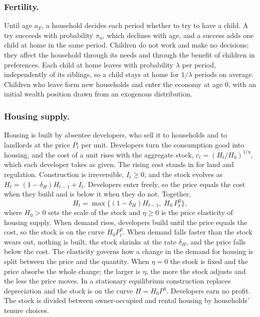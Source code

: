 \subsubsection*{Fertility.}
Until age $a_F$, a household decides each period whether to try to have a
child. A try succeeds with probability $\pi_a$, which declines with age, and a
success adds one child at home in the same period. Children do not work and
make no decisions; they affect the household through its needs and through
the benefit of children in preferences. Each child at home leaves with
probability $\lambda$ per period, independently of its siblings, so a child
stays at home for $1/\lambda$ periods on average. Children who leave form new
households and enter the economy at age $0$, with an initial wealth position
drawn from an exogenous distribution.

\subsubsection*{Housing supply.}
Housing is built by absentee developers, who sell it to households and to
landlords at the price $P_t$ per unit. Developers turn the consumption good
into housing, and the cost of a unit rises with the aggregate stock,
$c_t=(H_t/H_0)^{1/\eta}$, which each developer takes as given. The rising cost
stands in for land and regulation. Construction is irreversible, $I_t\ge0$,
and the stock evolves as $H_t=(1-\delta_H)H_{t-1}+I_t$. Developers enter
freely, so the price equals the cost when they build and is below it when they
do not. Together,
\begin{equation}
 H_t=\max\bigl\{(1-\delta_H)H_{t-1},\;H_0\,P_t^{\eta}\bigr\},
 \label{eq:m-supply}
\end{equation}
where $H_0>0$ sets the scale of the stock and $\eta\ge0$ is the price
elasticity of housing supply. When demand rises, developers build until the
price equals the cost, so the stock is on the curve $H_0P_t^{\eta}$. When
demand falls faster than the stock wears out, nothing is built, the stock
shrinks at the rate $\delta_H$, and the price falls below the cost. The
elasticity governs how a change in the demand for housing is split between
the price and the quantity. When $\eta=0$ the stock is fixed and the price
absorbs the whole change; the larger is $\eta$, the more the stock adjusts and
the less the price moves. In a stationary equilibrium construction replaces
depreciation and the stock is on the curve $H=H_0P^{\eta}$. Developers earn no
profit. The stock is divided between owner-occupied and rental housing by
households' tenure choices.

